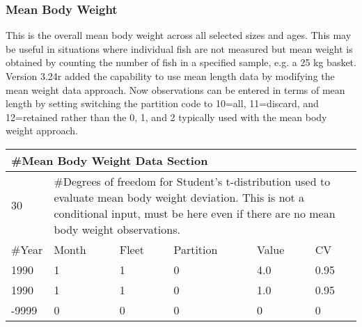 \subsubsection{Mean Body Weight}
This is the overall mean body weight across all selected sizes and ages.  This may be useful in situations where individual fish are not measured but mean weight is obtained by counting the number of fish in a specified sample, e.g. a 25 kg basket.  Version 3.24r added the capability to use mean length data by modifying the mean weight data approach.  Now observations can be entered in terms of mean length by setting switching the partition code to 10=all, 11=discard, and 12=retained rather than the 0, 1, and 2 typically used with the mean body weight approach.

\begin{center}
	\begin{tabular}{p{2cm} p{2cm} p{2cm} p{2cm} p{2cm} p{2cm}}
		\multicolumn{5}{l}{\#Mean Body Weight Data Section}\\
		\hline
		30 & \multicolumn{5}{l}{\parbox{11cm }{\#Degrees of freedom for Student's t-distribution used to evaluate mean body weight deviation.  This is not a conditional input, must be here even if there are no mean body weight observations.}}\\
		\hline
		\#Year & Month & Fleet & Partition & Value & CV \\
		\hline
		1990 & 1 & 1 & 0 & 4.0 & 0.95 \\
		1990 & 1 & 1 & 0 & 1.0 & 0.95 \\
		-9999& 0 & 0 & 0 & 0   & 0 \\
		\hline
	\end{tabular}
\end{center}

